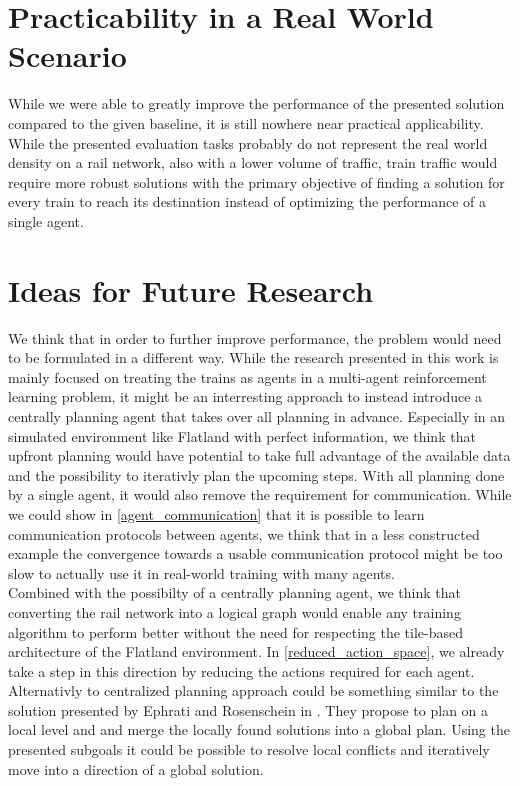 \section{Practicability in a Real World Scenario}\label{discussion_real_world}
While we were able to greatly improve the performance of the presented solution compared to the given baseline, it is still nowhere near practical applicability. While the presented evaluation tasks probably do not represent the real world density on a rail network, also with a lower volume of traffic, train traffic would require more robust solutions with the primary objective of finding a solution for every train to reach its destination instead of optimizing the performance of a single agent.

\section{Ideas for Future Research}\label{discussion_research}
We think that in order to further improve performance, the problem would need to be formulated in a different way. While the research presented in this work is mainly focused on treating the trains as agents in a multi-agent reinforcement learning problem, it might be an interresting approach to instead introduce a centrally planning agent that takes over all planning in advance. Especially in an simulated environment like Flatland with perfect information, we think that upfront planning would have potential to take full advantage of the available data and the possibility to iterativly plan the upcoming steps. With all planning done by a single agent, it would also remove the requirement for communication. While we could show in \autoref{agent_communication} that it is possible to learn communication protocols between agents, we think that in a less constructed example the convergence towards a usable communication protocol might be too slow to actually use it in real-world training with many agents.\\
Combined with the possibilty of a centrally planning agent, we think that converting the rail network into a logical graph would enable any training algorithm to perform better without the need for respecting the tile-based architecture of the Flatland environment. In \autoref{reduced_action_space}, we already take a step in this direction by reducing the actions required for each agent. Alternativly to centralized planning approach could be something similar to the solution presented by Ephrati and Rosenschein in \cite{Ephrati1993MultiAgentPA}. They propose to plan on a local level and and merge the locally found solutions into a global plan. Using the presented subgoals it could be possible to resolve local conflicts and iteratively move into a direction of a global solution.


